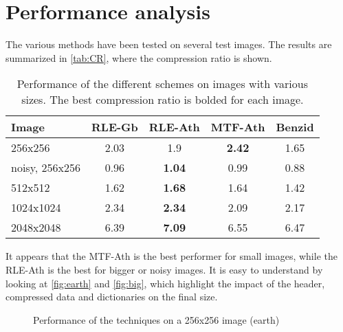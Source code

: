 \section{Performance analysis}

The various methods have been tested on several test images. The results are summarized in \autoref{tab:CR}, where the compression ratio is shown.

\begin{table}[h]
	\centering
	\begin{tabular}{|l|cccc|}
		\hline
		Image                 &RLE-Gb & RLE-Ath & MTF-Ath & Benzid \\ \hline
		256x256 & 2.03  & 1.9 & \textbf{2.42} & 1.65      \\
		noisy, 256x256 & 0.96 & \textbf{1.04} & 0.99   & 0.88   \\
		512x512  & 1.62  & \textbf{1.68} & 1.64 & 1.42 \\
		1024x1024 & 2.34 & \textbf{2.34} & 2.09 & 2.17\\
		2048x2048 & 6.39 & \textbf{7.09} & 6.55 & 6.47 \\ \hline
	\end{tabular}
	\caption{Performance of the different schemes on images with various sizes. The best compression ratio is bolded for each image.}
	\label{tab:CR}
\end{table}

\vspace*{-0.5cm}
It appears that the MTF-Ath is the best performer for small images, while the RLE-Ath is the best for bigger or noisy images. It is easy to understand by looking at \autoref{fig:earth} and \autoref{fig:big}, which highlight the impact of the header, compressed data and dictionaries on the final size.

\begin{figure}[h]
	\centering
	\caption{Performance of the techniques on a 256x256 image (earth)}
	\label{fig:earth}
\end{figure}

